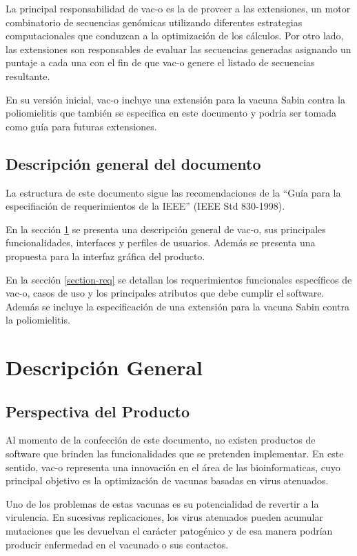 \documentclass[10pt,a4paper]{article}
\begin{document}
  La principal responsabilidad de vac-o es la de proveer a las extensiones, un motor combinatorio de secuencias gen\'omicas utilizando diferentes estrategias computacionales que conduzcan a la optimizaci\'on de los c\'alculos. Por otro lado, las extensiones son responsables de evaluar las secuencias generadas asignando un puntaje a cada una con el fin de que vac-o genere el listado de secuencias resultante.

  En su versi\'on inicial, vac-o incluye una extensi\'on para la vacuna Sabin contra la poliomielitis que tambi\'en se especifica en este documento y podr\'ia ser tomada como gu\'ia para futuras extensiones.

  \subsection{Descripci\'on general del documento}
  La estructura de este documento sigue las recomendaciones de la ``Gu\'ia para la especifiaci\'on de requerimientos de la IEEE'' (IEEE Std 830-1998).

  En la secci\'on \ref{section-desc-gral} se presenta una descripci\'on general de vac-o, sus principales funcionalidades, interfaces y perfiles de usuarios. Adem\'as se presenta una propuesta para la interfaz gr\'afica del producto.
  
  En la secci\'on \ref{section-req} se detallan los requerimientos funcionales espec\'ificos de vac-o, casos de uso y los principales atributos que debe cumplir el software. Adem\'as se incluye la especificaci\'on de una extensi\'on para la vacuna Sabin contra la poliomielitis.

\section{Descripci\'on General}
  \label{section-desc-gral}
  \subsection{Perspectiva del Producto}   
    Al momento de la confecci\'on de este documento, no existen productos de software que brinden las funcionalidades que se pretenden implementar. En este sentido, vac-o representa una innovaci\'on en el \'area de las bioinformaticas, cuyo principal objetivo es la optimizaci\'on de vacunas basadas en virus atenuados.
    
    Uno de los problemas de estas vacunas es su potencialidad de revertir a la virulencia. En sucesivas replicaciones, los virus atenuados pueden acumular mutaciones que les devuelvan el car\'acter patog\'enico y de esa manera podr\'ian producir enfermedad en el vacunado o sus contactos.
    
\end{document}
